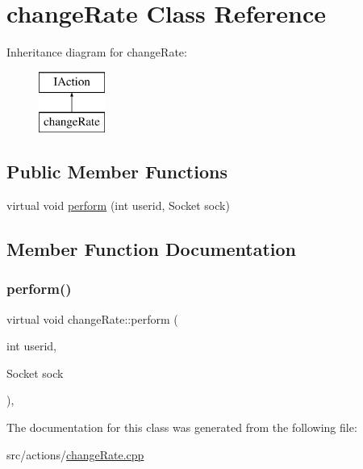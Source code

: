 \hypertarget{classchange_rate}{}\section{change\+Rate Class Reference}
\label{classchange_rate}
Inheritance diagram for change\+Rate\+:\begin{figure}[H]
\begin{center}
\leavevmode
\includegraphics[height=2.000000cm]{classchange_rate}
\end{center}
\end{figure}
\subsection*{Public Member Functions}
\begin{DoxyCompactItemize}
\item 
virtual void \mbox{\hyperlink{classchange_rate_a47fa95a4766f6828b6485c6ff3c4b620}{perform}} (int userid, Socket sock)
\end{DoxyCompactItemize}


\subsection{Member Function Documentation}
\mbox{\label{classchange_rate_a47fa95a4766f6828b6485c6ff3c4b620}} 
\subsubsection{\texorpdfstring{perform()}{perform()}}
{\footnotesize\ttfamily virtual void change\+Rate\+::perform (\begin{DoxyParamCaption}\item[{int}]{userid,  }\item[{Socket}]{sock }\end{DoxyParamCaption})\hspace{0.3cm}{\ttfamily [inline]}, {\ttfamily [virtual]}}



The documentation for this class was generated from the following file\+:\begin{DoxyCompactItemize}
\item 
src/actions/\mbox{\hyperlink{change_rate_8cpp}{change\+Rate.\+cpp}}\end{DoxyCompactItemize}
